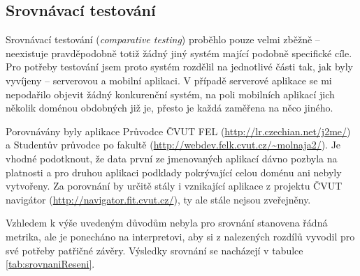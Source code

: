 \pagebreak
\subsection{Srovnávací testování}
Srovnávací testování (\textit{comparative testing}) proběhlo pouze velmi zběžně -- neexistuje pravděpodobně totiž žádný jiný systém mající podobně specifické cíle. Pro potřeby testování jsem proto systém rozdělil na jednotlivé části tak, jak byly vyvíjeny -- serverovou a mobilní aplikaci. V případě serverové aplikace se mi nepodařilo objevit žádný konkurenční systém, na poli mobilních aplikací jich několik doménou obdobných již je, přesto je každá zaměřena na něco jiného.

Porovnávány byly aplikace Průvodce ČVUT FEL (\url{http://lr.czechian.net/j2me/}) a Studentův průvodce po fakultě (\url{http://webdev.felk.cvut.cz/~molnaja2/}). Je vhodné podotknout, že data první ze jmenovaných aplikací dávno pozbyla na platnosti a pro druhou aplikaci podklady pokrývající celou doménu ani nebyly vytvořeny. Za porovnání by určitě stály i vznikající aplikace z projektu ČVUT navigátor (\url{http://navigator.fit.cvut.cz/}), ty ale stále nejsou zveřejněny.

Vzhledem k výše uvedeným důvodům nebyla pro srovnání stanovena řádná metrika, ale je ponecháno na interpretovi, aby si z nalezených rozdílů vyvodil pro své potřeby patřičné závěry. Výsledky srovnání se nacházejí v tabulce \ref{tab:srovnaniReseni}.

